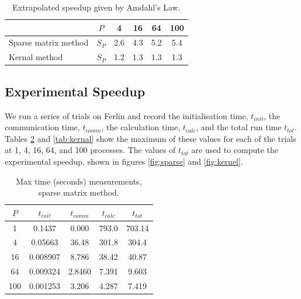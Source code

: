 \documentclass[a4paper,11pt]{article}
\begin{document}
\begin{table}[h]
\def\arraystretch{1.2}
\begin{center}
\caption{Extrapolated speedup given by Amdahl's Law.}
\label{tab:S_extrap}
\begin{tabular}{| l | c | c | c | c | c |}
\hline
&$P$ & 4 & 16 & 64 & 100 \\
\hline
Sparse matrix method & $S_P $& 2.6 & 4.3 & 5.2 & 5.4\\
\hline
Kernal method & $S_P $& 1.2 & 1.3 & 1.3 & 1.3\\
\hline
\end{tabular}
\end{center}
\end{table}

\subsection*{Experimental Speedup}
We run a series of trials on Ferlin and record the initialisation time, $t_{init}$, the communication time, $t_{comm}$, the calculation time, $t_{calc}$, and the total run time $t_{tot}$.  Tables \ref{tab:matrix} and \ref{tab:kernal} show the maximum of these values for each of the trials at 1, 4, 16, 64, and 100 processes.  The values of $t_{tot}$ are used to compute the experimental speedup, shown in figures \ref{fig:sparse} and \ref{fig:kernel}.

\begin{table}[h]
\def\arraystretch{1.2}
\begin{center}
\caption{Max time (seconds) measurements, sparse matrix method.}
\label{tab:matrix}
\begin{tabular}{| c | c | c | c | c |}
\hline
$P$ & $t_{init}$ & $t_{comm}$ & $t_{calc}$ & $t_{tot}$ \\
\hline
1 & 0.1437 &  0.000 & 793.0 & 703.14\\
\hline
4 & 0.05663 & 36.48 & 301.8 & 304.4\\
\hline
16 & 0.008907 & 8.786 & 38.42 & 40.87\\
\hline
64 & 0.009324 & 2.8460 & 7.391 & 9.603\\
\hline
100 & 0.001253 & 3.206 & 4.287 & 7.419\\
\hline
\end{tabular}
\end{center}
\end{table}
\end{document}
